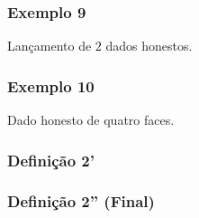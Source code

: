 \documentclass[a4paper]{article}
\begin{document}
	\subsubsection{Exemplo 9}
	
	\noindent Lançamento de $2$ dados honestos.
	
	\subsubsection{Exemplo 10}
	
	\noindent Dado honesto de quatro faces.
	
	\subsubsection{Definição 2'}
	
	\subsubsection{Definição 2'' (Final)}
		
	
		
	
\end{document}
